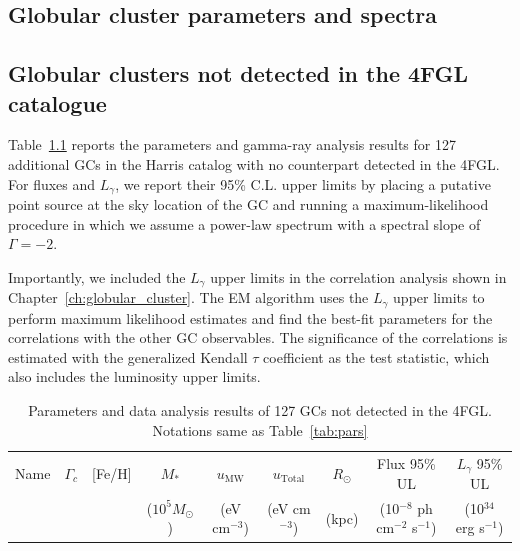 \documentclass[doublespace,nopageskip]{VTthesis} %
\begin{document}
\begin{appendices}

\chapter{Globular cluster parameters and spectra} \label{app:glbcs}
  
\section{Globular clusters not detected in the 4FGL catalogue}\label{appx:nodetect}

Table~\ref{tab:nondetect} reports the parameters and gamma-ray analysis results for 127 additional GCs in the Harris catalog with no counterpart detected in the 4FGL. For fluxes and $L_\gamma$, we report their 95\% C.L. upper limits by placing a putative point source at the sky location of the GC and running a maximum-likelihood procedure in which we assume a power-law spectrum with a spectral slope of $\Gamma = -2$.

Importantly, we included the $L_\gamma$ upper limits in the correlation analysis shown in Chapter~\ref{ch:globular_cluster}. The EM algorithm uses the $L_\gamma$ upper limits to perform maximum likelihood estimates and find the best-fit parameters for the correlations with the other GC observables. The significance of the correlations is estimated with the generalized Kendall $\tau$ coefficient as the test statistic, which also includes the luminosity upper limits. 

\begin{center}
\scriptsize
\begin{longtable}{lcccccccr}
\caption{Parameters and data analysis results of 127 GCs not detected in the 4FGL. Notations same as Table~\ref{tab:pars}}\label{tab:nondetect} \\
\hline \multicolumn{1}{c}{{Name}} & \multicolumn{1}{c}{{$\Gamma_c$}} & \multicolumn{1}{c}{{[Fe/H]}} & \multicolumn{1}{c}{{$M_*$}} & \multicolumn{1}{c}{{$u_\text{MW}$}} & \multicolumn{1}{c}{{$u_\text{Total}$}} & \multicolumn{1}{c}{{$R_\odot$}} & \multicolumn{1}{c}{{Flux 95\% UL}} & \multicolumn{1}{c}{{$L_\gamma$ 95\% UL}}\\ 
\multicolumn{1}{c}{{}} & \multicolumn{1}{c}{{}} & \multicolumn{1}{c}{{}} & \multicolumn{1}{c}{{($10^5 M_\odot$)}} & \multicolumn{1}{c}{{(eV cm$^{-3}$)}} & \multicolumn{1}{c}{{(eV cm$^{-3}$)}} & \multicolumn{1}{c}{{(kpc)}} & \multicolumn{1}{c}{{(10$^{-8}$ ph cm$^{-2}$ s$^{-1}$)}} & \multicolumn{1}{c}{{(10$^{34}$ erg s$^{-1}$)}}\\ \hline
\endfirsthead


\end{longtable}
\end{center}
\end{appendices}
\end{document}
